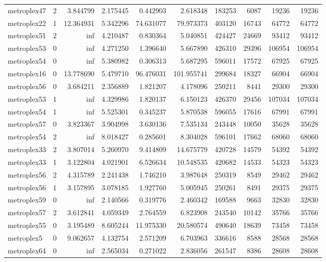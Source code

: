\begin{longtable}{|l|r|r|r|r|r|r|r|r|r|}
metroplex47 & 2 & 3.844799 & 2.175445 & 0.442903 & 2.618348 & 183253 & 6087 & 19236 & 19236 \\
metroplex22 & 1 & 12.364931 & 5.342296 & 74.631077 & 79.973373 & 403120 & 16743 & 64772 & 64772 \\
metroplex51 & 2 & inf & 4.210487 & 0.830364 & 5.040851 & 424427 & 24669 & 93412 & 93412 \\
metroplex53 & 0 & inf & 4.271250 & 1.396640 & 5.667890 & 426310 & 29396 & 106954 & 106954 \\
metroplex54 & 0 & inf & 5.380982 & 0.306313 & 5.687295 & 596011 & 17572 & 67925 & 67925 \\
metroplex16 & 0 & 13.778690 & 5.479710 & 96.476031 & 101.955741 & 299684 & 18327 & 66904 & 66904 \\
metroplex56 & 0 & 3.684211 & 2.356889 & 1.821207 & 4.178096 & 250211 & 8441 & 29300 & 29300 \\
metroplex53 & 1 & inf & 4.329986 & 1.820137 & 6.150123 & 426370 & 29456 & 107034 & 107034 \\
metroplex54 & 1 & inf & 5.525301 & 0.345237 & 5.870538 & 596055 & 17616 & 67991 & 67991 \\
metroplex57 & 0 & 3.823367 & 3.904998 & 3.630136 & 7.535134 & 243448 & 10050 & 35628 & 35628 \\
metroplex54 & 2 & inf & 8.018427 & 0.285601 & 8.304028 & 596101 & 17662 & 68060 & 68060 \\
metroplex33 & 2 & 3.807014 & 5.260970 & 9.414809 & 14.675779 & 420728 & 14579 & 54392 & 54392 \\
metroplex33 & 1 & 3.122804 & 4.021901 & 6.526634 & 10.548535 & 420682 & 14533 & 54323 & 54323 \\
metroplex56 & 2 & 4.315789 & 2.241438 & 1.746210 & 3.987648 & 250319 & 8549 & 29462 & 29462 \\
metroplex56 & 1 & 3.157895 & 3.078185 & 1.927760 & 5.005945 & 250261 & 8491 & 29375 & 29375 \\
metroplex59 & 0 & inf & 2.140566 & 0.319776 & 2.460342 & 169588 & 9663 & 32830 & 32830 \\
metroplex57 & 2 & 3.612841 & 4.059349 & 2.764559 & 6.823908 & 243540 & 10142 & 35766 & 35766 \\
metroplex55 & 0 & 3.195489 & 8.605244 & 11.975330 & 20.580574 & 490640 & 18639 & 73458 & 73458 \\
metroplex5 & 0 & 9.062657 & 4.132754 & 2.571209 & 6.703963 & 336616 & 8588 & 28568 & 28568 \\
metroplex64 & 0 & inf & 2.565034 & 0.271022 & 2.836056 & 261547 & 8386 & 28608 & 28608 \\

\end{longtable}
